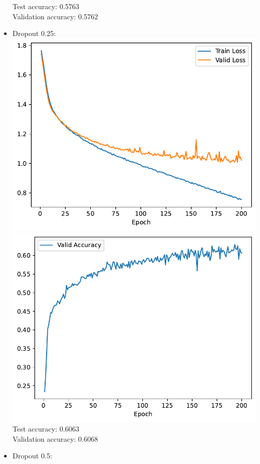 \documentclass[12pt,a4paper]{article}
\begin{document}
\begin{itemize}
                Test accuracy: 0.5763 \\
                Validation accuracy: 0.5762
            \item Dropout 0.25: \\
                \includegraphics[width=\imagewidth]{q2/q2_2b_dropout_0.25-training-loss.pdf}
                \includegraphics[width=\imagewidth]{q2/q2_2b_dropout_0.25-validation-accuracy.pdf} \\
                Test accuracy: 0.6063 \\
                Validation accuracy: 0.6068
            \newpage
            \item Dropout 0.5: \\

\end{itemize}
\end{document}
